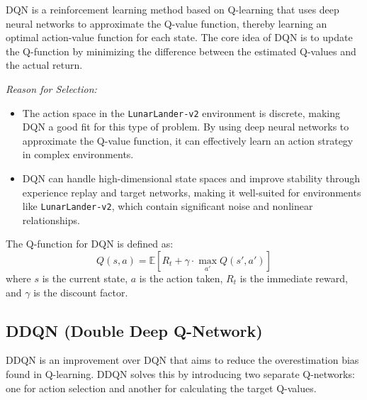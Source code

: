 \documentclass[conference]{IEEEtran}
\begin{document}
DQN is a reinforcement learning method based on Q-learning that uses deep neural networks to approximate the Q-value function, thereby learning an optimal action-value function for each state. The core idea of DQN is to update the Q-function by minimizing the difference between the estimated Q-values and the actual return.

\par \textit{\quad Reason for Selection:}
\begin{itemize}
    \item The action space in the \texttt{LunarLander-v2} environment is discrete, making DQN a good fit for this type of problem. By using deep neural networks to approximate the Q-value function, it can effectively learn an action strategy in complex environments.
    \item DQN can handle high-dimensional state spaces and improve stability through experience replay and target networks, making it well-suited for environments like \texttt{LunarLander-v2}, which contain significant noise and nonlinear relationships.
\end{itemize}

The Q-function for DQN is defined as:
\[
Q(s, a) = \mathbb{E}\left[ R_t + \gamma \cdot \max_{a'} Q(s', a') \right]
\]
where \(s\) is the current state, \(a\) is the action taken, \(R_t\) is the immediate reward, and \(\gamma\) is the discount factor.

\subsection{DDQN (Double Deep Q-Network)}

DDQN is an improvement over DQN that aims to reduce the overestimation bias found in Q-learning. DDQN solves this by introducing two separate Q-networks: one for action selection and another for calculating the target Q-values.
\end{document}
